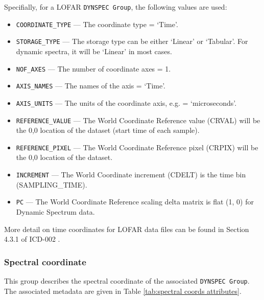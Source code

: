 \documentclass[a4paper,10pt,bibtotoc]{scrartcl}
\begin{document}
Specifially, for a LOFAR \texttt{DYNSPEC Group}, the following values are used:
\begin{itemize}
\item \verb|COORDINATE_TYPE| --- 
	The coordinate type = `Time'.
\item \verb|STORAGE_TYPE| ---
  The storage type can be either `Linear' or `Tabular'. For dynamic spectra, 
  it will be `Linear' in most cases.
\item \verb|NOF_AXES| --- 
	The number of coordinate axes =  1.
\item \verb|AXIS_NAMES| --- 
	The names of the axis = `Time'.
\item \verb|AXIS_UNITS| --- 
	The units of the coordinate axis, e.g. = `microseconds'.
\item \verb|REFERENCE_VALUE| ---
	The World Coordinate Reference value (CRVAL) will be the 0,0 location of the dataset (start time of each sample).
\item \verb|REFERENCE_PIXEL| ---
	The World Coordinate Reference pixel (CRPIX) will be the 0,0 location of the dataset.
\item \verb|INCREMENT| ---
	The World Coordinate increment (CDELT) is the time bin (SAMPLING\_TIME).
\item \verb|PC| ---
	The World Coordinate Reference scaling delta matrix is flat (1, 0) for Dynamic Spectrum data.

\end{itemize}

More detail on time coordinates for LOFAR data files can be found in 
Section 4.3.1 of ICD-002 \cite{lofar.icd.002}. 


\subsubsection{Spectral coordinate}
\label{sec:spectral coordinate}

This group describes the spectral coordinate of the associated 
\texttt{DYNSPEC Group}. The associated metadata are given in Table
\ref{tab:spectral coords attributes}.
\end{document}
